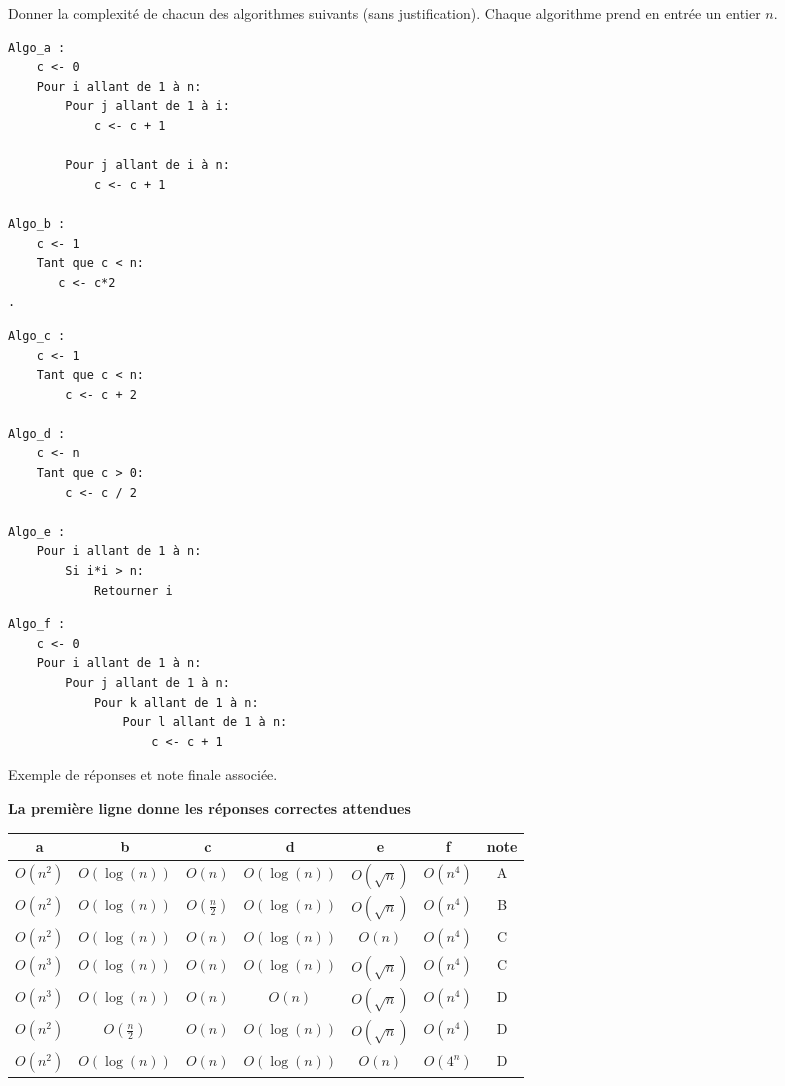 
\begin{exercice}[Partiel 2017-18]

Donner la complexité de chacun des algorithmes suivants (sans justification). Chaque algorithme 
prend en entrée un entier $n$. 

\begin{minipage}[t]{0.48 \textwidth}
\begin{lstlisting}
Algo_a :
    c <- 0
    Pour i allant de 1 à n:
        Pour j allant de 1 à i:
            c <- c + 1
            
        Pour j allant de i à n:
            c <- c + 1
            
Algo_b :
    c <- 1
    Tant que c < n:
       c <- c*2   
.       
\end{lstlisting}
\end{minipage}
\begin{minipage}[t]{0.48 \textwidth}
\begin{lstlisting}
Algo_c :
    c <- 1
    Tant que c < n:
        c <- c + 2

Algo_d :
    c <- n
    Tant que c > 0:
        c <- c / 2 

Algo_e :
    Pour i allant de 1 à n:
        Si i*i > n:
            Retourner i
\end{lstlisting}
\end{minipage}

\begin{lstlisting}
Algo_f :
    c <- 0
    Pour i allant de 1 à n:
        Pour j allant de 1 à n:
            Pour k allant de 1 à n:
                Pour l allant de 1 à n:
                    c <- c + 1
\end{lstlisting}

Exemple de réponses et note finale associée. 

\textbf{La première ligne donne les réponses correctes attendues}

\begin{tabular}{|c|c|c|c|c|c|c|}
\hline 
a & b & c & d & e & f & note \\ \hline
$O(n^2)$ & $O(\log(n))$ & $O(n)$ & $O(\log(n))$ & $O(\sqrt{n})$ & $O(n^4)$ & A \\ \hline \hline
$O(n^2)$ & $O(\log(n))$ & $O(\frac{n}{2})$ & $O(\log(n))$ & $O(\sqrt{n})$ & $O(n^4)$ & B \\ \hline 
$O(n^2)$ & $O(\log(n))$ & $O(n)$ & $O(\log(n))$ & $O(n)$ & $O(n^4)$ & C \\ \hline 
$O(n^3)$ & $O(\log(n))$ & $O(n)$ & $O(\log(n))$ & $O(\sqrt{n})$ & $O(n^4)$ & C \\ \hline
$O(n^3)$ & $O(\log(n))$ & $O(n)$ & $O(n)$ & $O(\sqrt{n})$ & $O(n^4)$ & D \\ \hline 
$O(n^2)$ & $O(\frac{n}{2})$ & $O(n)$ & $O(\log(n))$ & $O(\sqrt{n})$ & $O(n^4)$ & D \\ \hline 
$O(n^2)$ & $O(\log(n))$ & $O(n)$ & $O(\log(n))$ & $O(n)$ & $O(4^n)$ & D \\ \hline 
\end{tabular}


\end{exercice}
